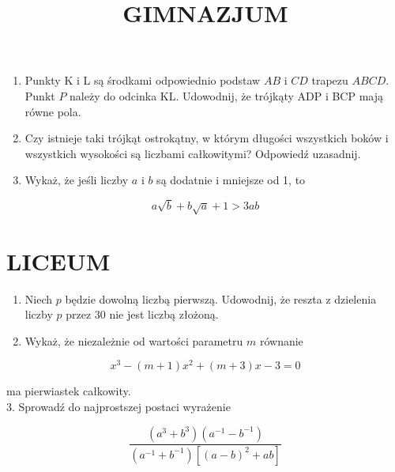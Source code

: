 \documentclass[10pt]{article}
\title{GIMNAZJUM }
\author{}
\date{}
\begin{document}
\maketitle
\begin{enumerate}
  \item Punkty K i L są środkami odpowiednio podstaw \(A B\) i \(C D\) trapezu \(A B C D\). Punkt \(P\) należy do odcinka KL. Udowodnij, że trójkąty ADP i BCP mają równe pola.
  \item Czy istnieje taki trójkąt ostrokątny, w którym długości wszystkich boków i wszystkich wysokości są liczbami całkowitymi? Odpowiedź uzasadnij.
  \item Wykaż, że jeśli liczby \(a\) i \(b\) są dodatnie i mniejsze od 1, to
\end{enumerate}

\[
a \sqrt{b}+b \sqrt{a}+1>3 a b
\]

\section*{LICEUM}
\begin{enumerate}
  \item Niech \(p\) będzie dowolną liczbą pierwszą. Udowodnij, że reszta z dzielenia liczby \(p\) przez 30 nie jest liczbą złożoną.
  \item Wykaż, że niezależnie od wartości parametru \(m\) równanie
\end{enumerate}

\[
x^{3}-(m+1) x^{2}+(m+3) x-3=0
\]

ma pierwiastek całkowity.\\
3. Sprowadź do najprostszej postaci wyrażenie

\[
\frac{\left(a^{3}+b^{3}\right)\left(a^{-1}-b^{-1}\right)}{\left(a^{-1}+b^{-1}\right)\left[(a-b)^{2}+a b\right]}
\]
\end{document}
